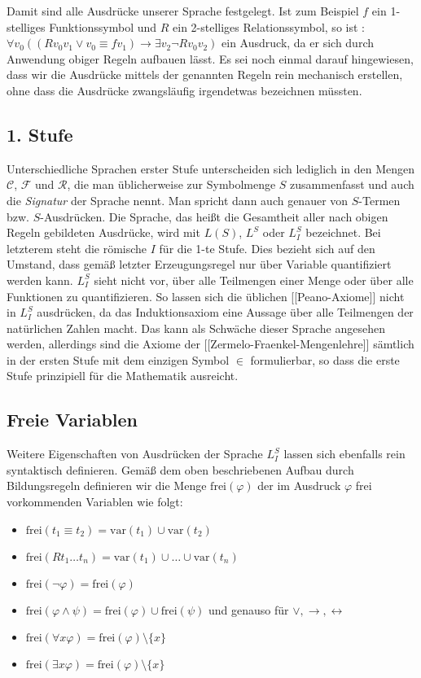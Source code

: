 Damit sind alle Ausdrücke unserer Sprache festgelegt. Ist zum Beispiel $f$ ein 1-stelliges Funktionssymbol und $R$ ein 2-stelliges Relationssymbol, so ist
: $\forall v_0((Rv_0v_1\lor v_0\equiv fv_1) \rightarrow \exists v_2 \neg Rv_0v_2)$
ein Ausdruck, da er sich durch Anwendung obiger Regeln aufbauen lässt. Es sei noch einmal darauf hingewiesen, dass wir die Ausdrücke mittels der genannten Regeln rein mechanisch erstellen, ohne dass die Ausdrücke zwangsläufig irgendetwas bezeichnen müssten.

\subsection{1. Stufe}
Unterschiedliche Sprachen erster Stufe unterscheiden sich lediglich in den Mengen $\mathcal C$, $\mathcal F$ und $\mathcal R$, die man üblicherweise zur Symbolmenge $S$ zusammenfasst und auch die \textit{Signatur} der Sprache nennt. Man spricht dann auch genauer von $S$-Termen bzw. $S$-Ausdrücken. Die Sprache, das heißt die Gesamtheit aller nach obigen Regeln gebildeten Ausdrücke, wird mit $L(S)$, $L^S$ oder $L_I^S$ bezeichnet. Bei letzterem steht die römische $I$ für die 1-te Stufe. Dies bezieht sich auf den Umstand, dass gemäß letzter Erzeugungsregel nur über Variable quantifiziert werden kann. $L_I^S$ sieht nicht vor, über alle Teilmengen einer Menge oder über alle Funktionen zu quantifizieren. So lassen sich die üblichen [[Peano-Axiome]] nicht in $L_I^S$ ausdrücken, da das Induktionsaxiom eine Aussage über alle Teilmengen der natürlichen Zahlen macht. Das kann als Schwäche dieser Sprache angesehen werden, allerdings sind die Axiome der [[Zermelo-Fraenkel-Mengenlehre]] sämtlich in der ersten Stufe mit dem einzigen Symbol $\in$ formulierbar, so dass die erste Stufe prinzipiell für die Mathematik ausreicht.

\subsection{Freie Variablen}
Weitere Eigenschaften von Ausdrücken der Sprache $L_I^S$ lassen sich ebenfalls rein syntaktisch definieren. Gemäß dem oben beschriebenen Aufbau durch Bildungsregeln definieren wir die Menge $\mathrm{frei}(\varphi)$ der im Ausdruck $\varphi$ frei vorkommenden Variablen wie folgt:

\begin{itemize}
	\item $\mathrm{frei}(t_1\equiv t_2) = \mathrm{var}(t_1)\cup \mathrm{var}(t_2)$
	\item $\mathrm{frei}(Rt_1\ldots t_n) = \mathrm{var}(t_1)\cup\ldots \cup \mathrm{var}(t_n)$
	\item $\mathrm{frei}(\neg \varphi) = \mathrm{frei}(\varphi)$
	\item $\mathrm{frei}(\varphi \land \psi) = \mathrm{frei}(\varphi)\cup \mathrm{frei}(\psi)$ und genauso für $\lor, \rightarrow, \leftrightarrow$
	\item $\mathrm{frei}(\forall x\varphi) = \mathrm{frei}(\varphi)\setminus \{x\}$
	\item $\mathrm{frei}(\exists x\varphi) = \mathrm{frei}(\varphi)\setminus \{x\}$
\end{itemize}

